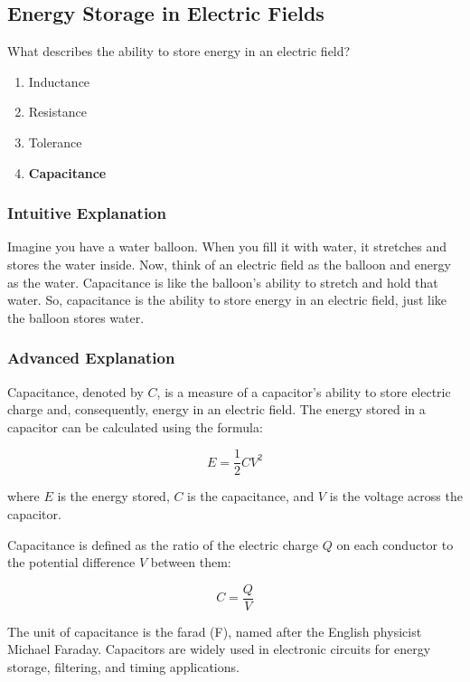 \subsection{Energy Storage in Electric Fields}
\label{T5C01}

\begin{tcolorbox}[colback=gray!10!white,colframe=black!75!black,title=T5C01]
What describes the ability to store energy in an electric field?
\begin{enumerate}[label=\Alph*)]
    \item Inductance
    \item Resistance
    \item Tolerance
    \item \textbf{Capacitance}
\end{enumerate}
\end{tcolorbox}

\subsubsection{Intuitive Explanation}
Imagine you have a water balloon. When you fill it with water, it stretches and stores the water inside. Now, think of an electric field as the balloon and energy as the water. Capacitance is like the balloon's ability to stretch and hold that water. So, capacitance is the ability to store energy in an electric field, just like the balloon stores water.

\subsubsection{Advanced Explanation}
Capacitance, denoted by \( C \), is a measure of a capacitor's ability to store electric charge and, consequently, energy in an electric field. The energy stored in a capacitor can be calculated using the formula:

\[
E = \frac{1}{2} C V^2
\]

where \( E \) is the energy stored, \( C \) is the capacitance, and \( V \) is the voltage across the capacitor. 

Capacitance is defined as the ratio of the electric charge \( Q \) on each conductor to the potential difference \( V \) between them:

\[
C = \frac{Q}{V}
\]

The unit of capacitance is the farad (F), named after the English physicist Michael Faraday. Capacitors are widely used in electronic circuits for energy storage, filtering, and timing applications.

